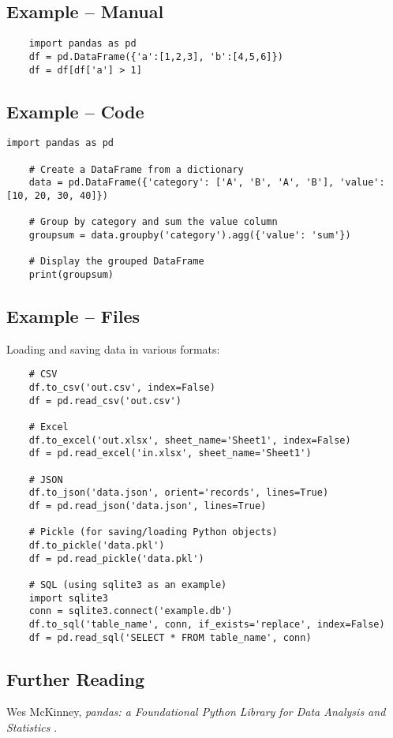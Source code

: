 \subsection{Example -- Manual}
\begin{verbatim}
	import pandas as pd
	df = pd.DataFrame({'a':[1,2,3], 'b':[4,5,6]})
	df = df[df['a'] > 1]
\end{verbatim}
\subsection{Example -- Code}
\begin{lstlisting}[style=pythonstyle,caption={Grouping and aggregating data},label={lst:pandas_group}]
	import pandas as pd
	
	# Create a DataFrame from a dictionary
	data = pd.DataFrame({'category': ['A', 'B', 'A', 'B'], 'value': [10, 20, 30, 40]})
	
	# Group by category and sum the value column
	groupsum = data.groupby('category').agg({'value': 'sum'})
	
	# Display the grouped DataFrame
	print(groupsum)
\end{lstlisting}

\subsection{Example -- Files}
Loading and saving data in various formats:
\begin{verbatim}
	# CSV
	df.to_csv('out.csv', index=False)
	df = pd.read_csv('out.csv')
	
	# Excel
	df.to_excel('out.xlsx', sheet_name='Sheet1', index=False)
	df = pd.read_excel('in.xlsx', sheet_name='Sheet1')
	
	# JSON
	df.to_json('data.json', orient='records', lines=True)
	df = pd.read_json('data.json', lines=True)
	
	# Pickle (for saving/loading Python objects)
	df.to_pickle('data.pkl')
	df = pd.read_pickle('data.pkl')
	
	# SQL (using sqlite3 as an example)
	import sqlite3
	conn = sqlite3.connect('example.db')
	df.to_sql('table_name', conn, if_exists='replace', index=False)
	df = pd.read_sql('SELECT * FROM table_name', conn)
\end{verbatim}


\subsection{Further Reading}
Wes McKinney, \textit{pandas: a Foundational Python Library for Data Analysis and Statistics} \cite{mckinney2011pandas}.

